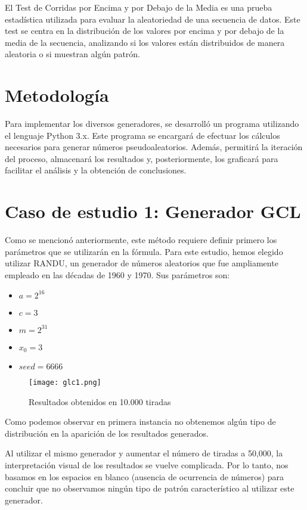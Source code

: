\documentclass{article}
\begin{document}
El Test de Corridas por Encima y por Debajo de la Media es una prueba estadística utilizada para evaluar la aleatoriedad de una secuencia de datos. Este test se centra en la distribución de los valores por encima y por debajo de la media de la secuencia, analizando si los valores están distribuidos de manera aleatoria o si muestran algún patrón.

\section{Metodología}

Para implementar los diversos generadores, se desarrolló un programa utilizando el lenguaje Python 3.x. Este programa se encargará de efectuar los cálculos necesarios para generar números pseudoaleatorios. Además, permitirá la iteración del proceso, almacenará los resultados y, posteriormente, los graficará para facilitar el análisis y la obtención de conclusiones.


\section{Caso de estudio 1: Generador GCL}

Como se mencionó anteriormente, este método requiere definir primero los parámetros que se utilizarán en la fórmula. Para este estudio, hemos elegido utilizar RANDU, un generador de números aleatorios que fue ampliamente empleado en las décadas de 1960 y 1970. Sus parámetros son:

\begin{itemize}
    \item $a = 2^{16}$
    \item $c = 3$
    \item $m =2^{31}$
    \item $x_{0} = 3$ 
    \item $seed = 6666$
\end{itemize}

\begin{figure}[H]
    \centering
    \texttt{[image: glc1.png]}
    \caption{Resultados obtenidos en 10.000 tiradas}
    \label{fig:glc-10000}
\end{figure}

Como podemos observar en primera instancia no obtenemos algún tipo de distribución en la aparición de los resultados generados.

Al utilizar el mismo generador y aumentar el número de tiradas a 50,000, la interpretación visual de los resultados se vuelve complicada. Por lo tanto, nos basamos en los espacios en blanco (ausencia de ocurrencia de números) para concluir que no observamos ningún tipo de patrón característico al utilizar este generador.
\end{document}
